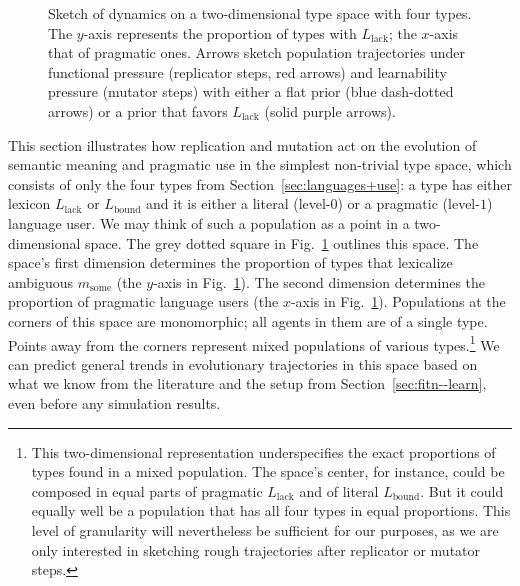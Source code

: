 \documentclass[a4paper, 11pt]{article}
\theoremstyle{Satz}
\newcommand{\mylang}[1]{\ensuremath{L_{\text{#1}}}\xspace} %
\newcommand{\messg}{\ensuremath{m}\xspace}		%
\newcommand{\mymessg}[1]{\ensuremath{\messg_{\text{#1}}}\xspace} %
\newcommand{\msome}{\mymessg{some}}
\newcommand{\Lbound}{\mylang{bound}}
\newcommand{\Llack}{\mylang{lack}}
\begin{document}
\begin{figure}
\caption{Sketch of dynamics on a two-dimensional type space with four types. The $y$-axis
  represents the proportion of types with $\Llack$; the $x$-axis that of pragmatic ones. Arrows
  sketch population trajectories under functional pressure (replicator steps, red arrows) and
  learnability pressure (mutator steps) with either a flat prior (blue dash-dotted arrows) or a
  prior that favors $\Llack$ (solid purple arrows).}
\label{fig:sketch}
\end{figure}

This section illustrates how replication and mutation act on the evolution of semantic meaning
and pragmatic use in the simplest non-trivial type space, which consists of only the four types
from Section~\ref{sec:languages+use}: a type has either lexicon $\Llack$ or $\Lbound$ and it is
either a literal (level-$0$) or a pragmatic (level-$1$) language user. We may think of such a
population as a point in a two-dimensional space. The grey dotted square in
Fig.~\ref{fig:sketch} outlines this space. The space's first dimension determines the
proportion of types that lexicalize ambiguous $\msome$ (the $y$-axis in
Fig.~\ref{fig:sketch}). The second dimension determines the proportion of pragmatic language
users (the $x$-axis in Fig.~\ref{fig:sketch}). Populations at the corners of this space are
monomorphic; all agents in them are of a single type. Points away from the corners represent
mixed populations of various types.\footnote{This two-dimensional representation underspecifies
  the exact proportions of types found in a mixed population. The space's center, for instance,
  could be composed in equal parts of pragmatic $\Llack$ and of literal $\Lbound$. But it could
  equally well be a population that has all four types in equal proportions. This level of
  granularity will nevertheless be sufficient for our purposes, as we are only interested in
  sketching rough trajectories after replicator or mutator steps.} We can predict general
trends in evolutionary trajectories in this space based on what we know from the literature and
the setup from Section~\ref{sec:fitn--learn}, even before any simulation results.
\end{document}
